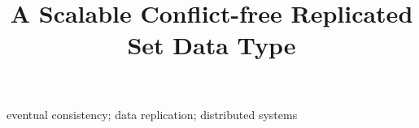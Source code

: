 \documentclass[10pt,conference,letterpaper]{IEEEtran}
\begin{document}
\title{A Scalable Conflict-free Replicated Set Data Type}

\author{
\and
{}
}

\maketitle


\begin{IEEEkeywords}
eventual consistency; data replication; distributed systems
\end{IEEEkeywords}



















\end{document}
